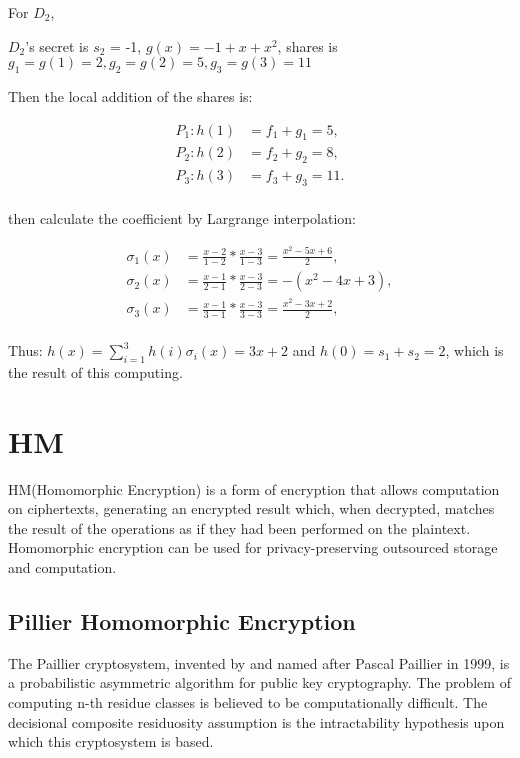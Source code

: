 \documentclass[a4paper,11pt]{article}
\begin{document}
For $D_2$,

$D_{2}$'s  secret is $s_2$ = -1, $g(x) = -1 + x + x^2$, shares is $g_1 = g(1) = 2, g_2 = g(2) = 5, g_3 = g(3) = 11$


Then the local addition of the shares is:

\begin{equation}
\begin{split}
P_1 : h(1) &= f_1 + g_1 = 5,    \\
P_2 : h(2) &= f_2 + g_2 = 8,    \\
P_3 : h(3) &= f_3 + g_3 = 11. \\
\end{split}
\end{equation}

then calculate the coefficient by Largrange interpolation:

\begin{equation}
\begin{split}
\sigma_{1}(x) &= \frac{x - 2}{1 - 2} * \frac{x - 3}{1-3} = \frac{x^2 - 5x + 6}{2},  \\
\sigma_{2}(x) &= \frac{x - 1}{2 - 1} * \frac{x - 3}{2-3} = -(x^2 - 4x + 3),  \\
\sigma_{3}(x) &= \frac{x - 1}{3 - 1} * \frac{x - 3}{3-3} = \frac{x^2 - 3x + 2}{2},  \\
\end{split}
\end{equation}

Thus: $ h(x) = \sum_{i=1}^{3}h(i)\sigma_{i}(x) = 3x + 2$ and  $h(0) = s_1 + s_2 = 2$, which is the result of this computing.
 
\section{HM}

HM(Homomorphic Encryption) is a form of encryption that allows computation on ciphertexts, generating an encrypted result which, when decrypted, matches the result of the operations as if they had been performed on the plaintext. Homomorphic encryption can be used for privacy-preserving outsourced storage and computation. 

\subsection{Pillier Homomorphic Encryption}

The Paillier cryptosystem, invented by and named after Pascal Paillier in 1999, is a probabilistic asymmetric algorithm for public key cryptography. The problem of computing n-th residue classes is believed to be computationally difficult. The decisional composite residuosity assumption is the intractability hypothesis upon which this cryptosystem is based.
\end{document}
